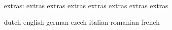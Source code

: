                    extras: extras                    extras
                           extras                    extras
                           extras                    extras
                           extras

\stopconstants




\startvariables            dutch                     english
                           german                    czech
                           italian                   romanian
                           french

